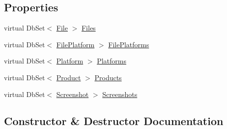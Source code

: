 \subsection*{Properties}
\begin{DoxyCompactItemize}
\item 
virtual Db\+Set$<$ \hyperlink{class_open_1_1_g_i_1_1hypermart_1_1_models_1_1_file}{File} $>$ \hyperlink{class_open_1_1_g_i_1_1hypermart_1_1_models_1_1_model1_container_a446f391e8b281cf4e3e71f369940189c}{Files}
\item 
virtual Db\+Set$<$ \hyperlink{class_open_1_1_g_i_1_1hypermart_1_1_models_1_1_file_platform}{File\+Platform} $>$ \hyperlink{class_open_1_1_g_i_1_1hypermart_1_1_models_1_1_model1_container_ad8999f3ba131f3c46c9162b2eff4c7f9}{File\+Platforms}
\item 
virtual Db\+Set$<$ \hyperlink{class_open_1_1_g_i_1_1hypermart_1_1_models_1_1_platform}{Platform} $>$ \hyperlink{class_open_1_1_g_i_1_1hypermart_1_1_models_1_1_model1_container_a47b249679414da9e63797516568ddb73}{Platforms}
\item 
virtual Db\+Set$<$ \hyperlink{class_open_1_1_g_i_1_1hypermart_1_1_models_1_1_product}{Product} $>$ \hyperlink{class_open_1_1_g_i_1_1hypermart_1_1_models_1_1_model1_container_a3152c9cb162bad57e707fb1a6b48152c}{Products}
\item 
virtual Db\+Set$<$ \hyperlink{class_open_1_1_g_i_1_1hypermart_1_1_models_1_1_screenshot}{Screenshot} $>$ \hyperlink{class_open_1_1_g_i_1_1hypermart_1_1_models_1_1_model1_container_a16840948ed271ebac66728f3398b6696}{Screenshots}
\end{DoxyCompactItemize}


\subsection{Constructor \& Destructor Documentation}
\hypertarget{class_open_1_1_g_i_1_1hypermart_1_1_models_1_1_model1_container_a8d957335d29c47427c9d9062c11e6205}{}\label{class_open_1_1_g_i_1_1hypermart_1_1_models_1_1_model1_container_a8d957335d29c47427c9d9062c11e6205} 
